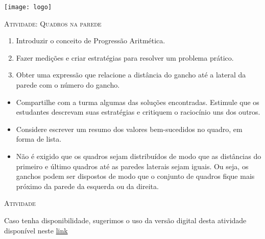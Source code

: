 \documentclass[10 pt,usenames,dvipsnames, oneside]{article}
\begin{document}
\begin{center}
  \begin{minipage}[l]{3cm}
\texttt{[image: logo]}    
\end{minipage}\hfill
\begin{minipage}[r]{.8\textwidth}
 {\Large \scshape Atividade: Quadros na parede}  
\end{minipage}
\end{center}
\vspace{.2cm}

\ifdefined\prof
\begin{objetivos}
\item \phantom{a}
\end{objetivos}

\begin{goals}
\begin{enumerate}
\item Introduzir o conceito de Progressão Aritmética.
\item  Fazer medições e criar estratégias para resolver um problema prático.
\item  Obter uma expressão que relacione a distância do gancho até a lateral da parede com o número do gancho.

\end{enumerate}

\tcblower

\begin{itemize}
\item Compartilhe com a turma algumas das soluções encontradas. Estimule que os estudantes descrevam suas estratégias e critiquem o raciocínio uns dos outros.
\item  Considere escrever um resumo dos valores bem-sucedidos no quadro, em
forma de lista.
\item  Não é exigido que os quadros sejam distribuídos de modo que as distâncias do primeiro e último quadros até as paredes laterais sejam iguais. Ou seja, os ganchos podem ser dispostos de modo que o conjunto de quadros fique mais próximo da parede da esquerda ou da direita.
\end{itemize}

\end{goals}

\bigskip
\begin{center}
{\large \scshape Atividade}
\end{center}
\fi

Caso tenha disponibilidade, sugerimos o uso da versão digital desta atividade disponível neste \href{https://teacher.desmos.com/activitybuilder/custom/5e7ba1a876309d7f9879af12}{link}
\end{document}
